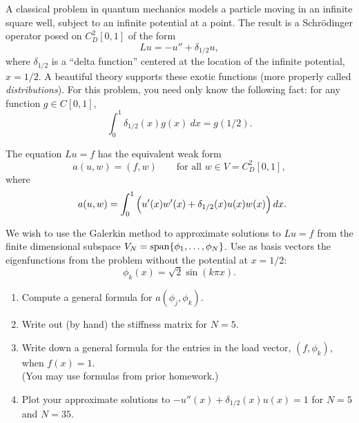 A classical problem in quantum mechanics models a particle moving in
an infinite square well, subject to an infinite potential at a point.
The result is a Schr\"odinger operator posed on $C^2_D[0,1]$ of the form
\[ L u = -u'' + \delta_{1/2} u,\]
where $\delta_{1/2}$ is a ``delta function'' centered at the location of
the infinite potential, $x=1/2$.  A beautiful theory supports these
exotic functions (more properly called \emph{distributions}).  
For this problem,
you need only know the following fact: for any function $g\in C[0,1]$,
\[ \int_0^1 \delta_{1/2}(x) g(x) \ d x = g(1/2).\]

The equation $Lu = f$ has the equivalent weak form
\[ a(u, w) = (f,w) \qquad \mbox{for all $w\in V = C^2_D[0,1]$},\]
where
\[ \kern6pt a(u,w) = \int_0^1 \Big(u'(x) w'(x) + \delta_{1/2}(x) u(x) w(x)\Big)\, d x.\]

\vspace*{1em}
We wish to use the Galerkin method to approximate solutions to $Lu = f$
from the finite dimensional subspace
$V_N = {\rm span}\{\phi_1, \ldots, \phi_N\}$.
Use as basis vectors the eigenfunctions from the problem
without the potential at $x=1/2$:
\[ \phi_k(x) = \sqrt{2} \sin(k \pi x).\]

\vspace*{1em}

\begin{enumerate}
\item Compute a general formula for $a(\phi_j, \phi_k)$.

\vspace*{1em}
\item Write out (by hand) the stiffness matrix for $N=5$.

\vspace*{1em}
\item Write down a general formula for the entries in the load vector, $(f,\phi_k)$,
      when $f(x) = 1$.\\  (You may use formulas from prior homework.)

\vspace*{1em}
\item Plot your approximate solutions to $-u''(x) + \delta_{1/2}(x) u(x) = 1$
      for $N=5$ and $N=35$.
\end{enumerate}


